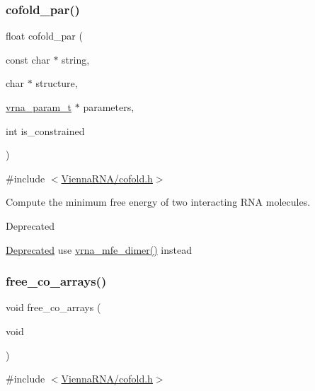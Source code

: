 \subsubsection{\texorpdfstring{cofold\_par()}{cofold\_par()}}
{\footnotesize\ttfamily float cofold\+\_\+par (\begin{DoxyParamCaption}\item[{const char $\ast$}]{string,  }\item[{char $\ast$}]{structure,  }\item[{\mbox{\hyperlink{group__energy__parameters_ga8a69ca7d787e4fd6079914f5343a1f35}{vrna\+\_\+param\+\_\+t}} $\ast$}]{parameters,  }\item[{int}]{is\+\_\+constrained }\end{DoxyParamCaption})}



{\ttfamily \#include $<$\mbox{\hyperlink{cofold_8h}{Vienna\+R\+N\+A/cofold.\+h}}$>$}



Compute the minimum free energy of two interacting R\+NA molecules. 

\begin{DoxyRefDesc}{Deprecated}
\item[\mbox{\hyperlink{deprecated__deprecated000031}{Deprecated}}]use \mbox{\hyperlink{group__mfe__global_gaab22d10c1190f205f16a77cab9d5d3ee}{vrna\+\_\+mfe\+\_\+dimer()}} instead\end{DoxyRefDesc}
\mbox{\label{group__mfe__global__deprecated_gaafb33d7473eb9af9d1b168ca8761c41a}} 
\subsubsection{\texorpdfstring{free\_co\_arrays()}{free\_co\_arrays()}}
{\footnotesize\ttfamily void free\+\_\+co\+\_\+arrays (\begin{DoxyParamCaption}\item[{void}]{ }\end{DoxyParamCaption})}



{\ttfamily \#include $<$\mbox{\hyperlink{cofold_8h}{Vienna\+R\+N\+A/cofold.\+h}}$>$}




